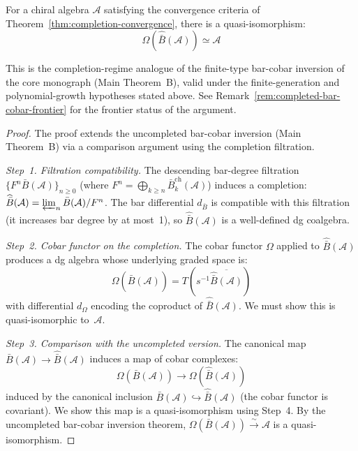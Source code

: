 \begin{theorem}\label{thm:completed-bar-cobar}
For a chiral algebra $\mathcal{A}$ satisfying the convergence criteria of
Theorem~\textup{\ref{thm:completion-convergence}}, there is a quasi-isomorphism:
\[\Omega(\widehat{\bar{B}}(\mathcal{A})) \simeq \mathcal{A}\]

This is the completion-regime analogue of the finite-type bar-cobar
inversion of the core monograph (Main Theorem~B), valid under the
finite-generation and polynomial-growth hypotheses stated above.
See Remark~\textup{\ref{rem:completed-bar-cobar-frontier}} for the
frontier status of the argument.
\end{theorem}

\begin{proof}
The proof extends the uncompleted bar-cobar inversion (Main Theorem~B) via a comparison argument using the completion filtration.

\emph{Step~1. Filtration compatibility.}
The descending bar-degree filtration $\{F^n\bar{B}(\mathcal{A})\}_{n \geq 0}$
(where $F^n = \bigoplus_{k \geq n} \bar{B}^{\mathrm{ch}}_k(\mathcal{A})$)
induces a completion:
$\widehat{\bar{B}}(\mathcal{A}) = \varprojlim_n \bar{B}(\mathcal{A})/F^n$.
The bar differential $d_{\bar{B}}$ is compatible with this filtration
(it increases bar degree by at most~1),
so $\widehat{\bar{B}}(\mathcal{A})$ is a well-defined dg coalgebra.

\emph{Step~2. Cobar functor on the completion.}
The cobar functor $\Omega$ applied to $\widehat{\bar{B}}(\mathcal{A})$ produces a dg algebra whose underlying graded space is:
\[
\Omega(\widehat{\bar{B}}(\mathcal{A})) = T(s^{-1}\overline{\widehat{\bar{B}}(\mathcal{A})})
\]
with differential $d_\Omega$ encoding the coproduct of $\widehat{\bar{B}}(\mathcal{A})$.  We must show this is quasi-isomorphic to~$\mathcal{A}$.

\emph{Step~3. Comparison with the uncompleted version.}
The canonical map $\bar{B}(\mathcal{A}) \to \widehat{\bar{B}}(\mathcal{A})$ induces a map of cobar complexes:
\[
\Omega(\bar{B}(\mathcal{A})) \longrightarrow \Omega(\widehat{\bar{B}}(\mathcal{A}))
\]
induced by the canonical inclusion $\bar{B}(\mathcal{A}) \hookrightarrow \widehat{\bar{B}}(\mathcal{A})$ (the cobar functor is covariant).  We show this map is a quasi-isomorphism using Step~4.  By the uncompleted bar-cobar inversion theorem, $\Omega(\bar{B}(\mathcal{A})) \xrightarrow{\sim} \mathcal{A}$ is a quasi-isomorphism.


\end{proof}
